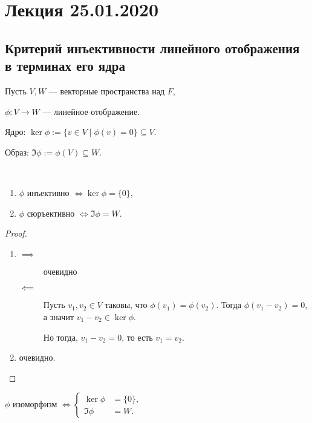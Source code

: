 \section{Лекция 25.01.2020}

\subsection{Критерий инъективности линейного отображения в терминах его ядра}

Пусть $V, W$ --- векторные пространства над $F$, 

$\phi : V \to W$ --- линейное отображение.

Ядро: $\ker \phi := \{v \in V \mid \phi(v) = 0\} \subseteq V$.

Образ: $\Im \phi := \phi(V) \subseteq W$.

\begin{proposal}~
    \begin{enumerate}[label=(\alph*)]
    \item $\phi$ инъективно $\iff \ker \phi = \{0\}$,
    \item $\phi$ сюръективно $\iff \Im \phi = W$.
    \end{enumerate}
\end{proposal}

\begin{proof}~
    \begin{enumerate}[label=(\alph*)]
    \item 
        \begin{description}
        \item[$\implies$] очевидно
        \item[$\impliedby$] 
            Пусть $v_1, v_2 \in V$ таковы, что $\phi(v_1) = \phi(v_2)$. 
            Тогда $\phi(v_1 - v_2) = 0$, а значит $v_1 - v_2 \in \ker \phi$.

            Но тогда, $v_1 - v_2 = 0$, то есть $v_1 = v_2$.
        \end{description}
    \item очевидно.
        \qedhere
    \end{enumerate}
\end{proof}

\begin{corollary}
    $\phi$ изоморфизм
    \begin{math}
        \iff
        \left\{
        \begin{aligned}
            \ker \phi &= \{0\},\\
            \Im \phi &= W.
        \end{aligned}
        \right.
    \end{math}
\end{corollary}


